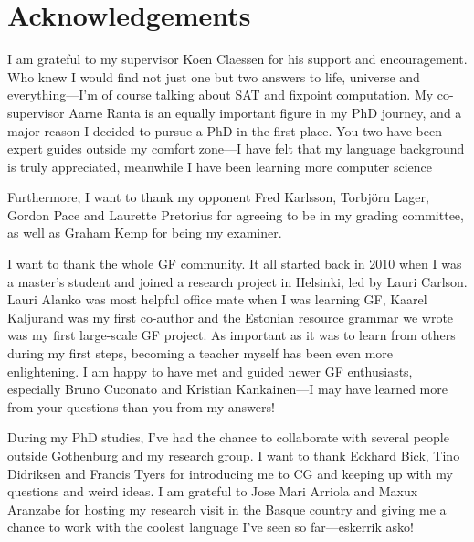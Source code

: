 \chapter*{Acknowledgements}\label{chp:acknowledgements}






I am grateful to my supervisor Koen Claessen for his support and encouragement.
Who knew I would find not just one but two answers to life, universe
and everything---I'm of course talking about SAT and fixpoint
computation.
My co-supervisor Aarne Ranta is an equally important figure in my PhD
journey, and a major reason I decided to pursue a PhD in the first
place. 
You two have been expert guides outside my comfort zone---I have felt
that my language background is truly appreciated, meanwhile I have
been learning more computer science

Furthermore, I want to thank my opponent Fred Karlsson, Torbjörn
Lager, Gordon Pace and Laurette Pretorius for agreeing to be in my
grading committee, as well as Graham Kemp for being my examiner.


I want to thank the whole GF community.
It all started back in 2010 when I was a master's student and joined a
research project in Helsinki, led by Lauri Carlson. Lauri Alanko was
most helpful office mate when I was learning GF, Kaarel Kaljurand was
my first co-author and the Estonian resource grammar we wrote was my
first large-scale GF project.  As important as it was to learn from
others during my first steps, becoming a teacher myself has been even
more enlightening. I am happy to have met and guided newer GF
enthusiasts, especially Bruno Cuconato and Kristian Kankainen---I may
have learned more from your questions than you from my answers!

During my PhD studies, I've had the chance to collaborate with several
people outside Gothenburg and my research group. I want to thank
Eckhard Bick, Tino Didriksen and Francis Tyers for introducing me to
CG and keeping up with my questions and weird ideas.  I am grateful to
Jose Mari Arriola and Maxux Aranzabe for hosting my research visit in
the Basque country and giving me a chance to work with the coolest
language I've seen so far---eskerrik asko!

